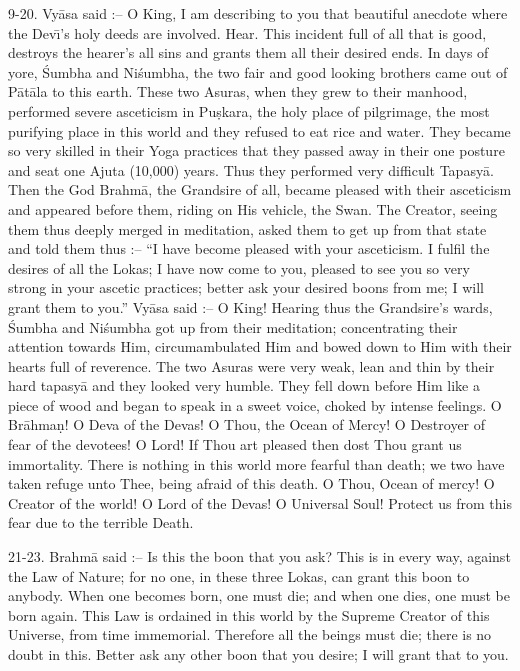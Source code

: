 9-20. Vy\=asa said :-- O King, I am describing to you that beautiful anecdote where the Dev\={\i}'s holy deeds are involved. Hear. This incident full of all that is good, destroys the hearer's all sins and grants them all their desired ends. In days of yore, \'Sumbha and Ni\'sumbha, the two fair and good looking brothers came out of P\=at\=ala to this earth. These two Asuras, when they grew to their manhood, performed severe asceticism in Pu\d{s}kara, the holy place of pilgrimage, the most purifying place in this world and they refused to eat rice and water. They became so very skilled in their Yoga practices that they passed away in their one posture and seat one Ajuta (10,000) years. Thus they performed very difficult Tapasy\=a. Then the God Brahm\=a, the Grandsire of all, became pleased with their asceticism and appeared before them, riding on His vehicle, the Swan. The Creator, seeing them thus deeply merged in meditation, asked them to get up from that state and told them thus :-- ``I have become pleased with your asceticism. I fulfil the desires of all the Lokas; I have now come to you, pleased to see you so very strong in your ascetic practices; better ask your desired boons from me; I will grant them to you.'' Vy\=asa said :-- O King! Hearing thus the Grandsire's wards, \'Sumbha and Ni\'sumbha got up from their meditation; concentrating their attention towards Him, circumambulated Him and bowed down to Him with their hearts full of reverence. The two Asuras were very weak, lean and thin by their hard tapasy\=a and they looked very humble. They fell down before Him like a piece of wood and began to speak in a sweet voice, choked by intense feelings. O Br\=ahma\d{n}! O Deva of the Devas! O Thou, the Ocean of Mercy! O Destroyer of fear of the devotees! O Lord! If Thou art pleased then dost Thou grant us immortality. There is nothing in this world more fearful than death; we two have taken refuge unto Thee, being afraid of this death. O Thou, Ocean of mercy! O Creator of the world! O Lord of the Devas! O Universal Soul! Protect us from this fear due to the terrible Death.

21-23. Brahm\=a said :-- Is this the boon that you ask? This is in every way, against the Law of Nature; for no one, in these three Lokas, can grant this boon to anybody. When one becomes born, one must die; and when one dies, one must be born again. This Law is ordained in this world by the Supreme Creator of this Universe, from time immemorial. Therefore all the beings must die; there is no doubt in this. Better ask any other boon that you desire; I will grant that to you.


